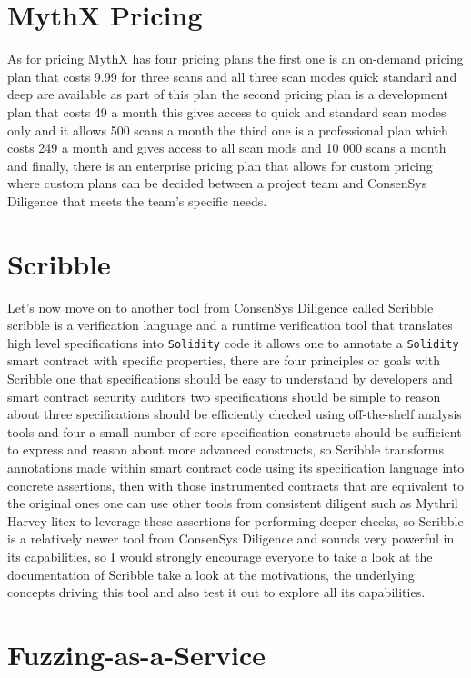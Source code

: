 \section{MythX Pricing}

As for pricing MythX has four pricing plans the first one is an on-demand pricing plan that costs 9.99 for three scans and all three scan modes quick standard and deep are available as part of this plan the second pricing plan is a development plan that costs 49 a month this gives access to quick and standard scan modes only and it allows 500 scans a month the third one is a professional plan which costs 249 a month and gives access to all scan mods and 10 000 scans a month and finally, there is an enterprise pricing plan that allows for custom pricing where custom plans can be decided between a project team and ConsenSys Diligence that meets the team's specific needs.

\section{Scribble}

Let's now move on to another tool from ConsenSys Diligence called Scribble scribble is a verification language and a runtime verification tool that translates high level specifications into \verb|Solidity| code it allows one to annotate a \verb|Solidity| smart contract with specific properties, there are four principles or goals with Scribble one that specifications should be easy to understand by developers and smart contract security auditors two specifications should be simple to reason about three specifications should be efficiently checked using off-the-shelf analysis tools and four a small number of core specification constructs should be sufficient to express and reason about more advanced constructs, so Scribble transforms annotations made within smart contract code using its specification language into concrete assertions, then with those instrumented contracts that are equivalent to the original ones one can use other tools from consistent diligent such as Mythril Harvey litex to leverage these assertions for performing deeper checks, so Scribble is a relatively newer tool from ConsenSys Diligence and sounds very powerful in its capabilities, so I would strongly encourage everyone to take a look at the documentation of Scribble take a look at the motivations, the underlying concepts driving this tool and also test it out to explore all its capabilities.

\section{Fuzzing-as-a-Service}

